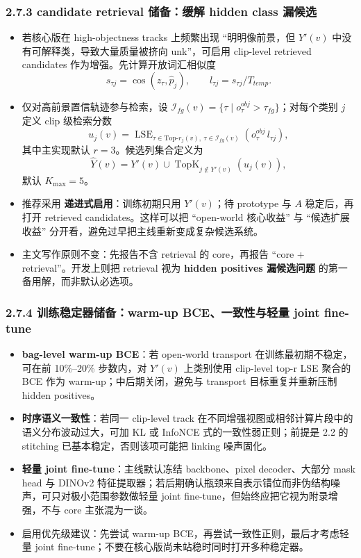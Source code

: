 \documentclass[UTF8]{ctexart}
\begin{document}
\subsubsection*{2.7.3 candidate retrieval 储备：缓解 hidden class 漏候选}
\begin{itemize}
\item 若核心版在 high-objectness tracks 上频繁出现 ``明明像前景，但 $Y'(v)$ 中没有可解释类，导致大量质量被挤向 unk''，可启用 clip-level retrieved candidates 作为增强。先计算开放词汇相似度
\[
 s_{\tau j}=\cos(z_\tau,\hat p_j),\qquad l_{\tau j}=s_{\tau j}/T_{temp}.
\]
\item 仅对高前景置信轨迹参与检索，设 $\mathcal I_{fg}(v)=\{\tau\mid o_\tau^{obj}>\tau_{fg}\}$；对每个类别 $j$ 定义 clip 级检索分数
\[
 u_j(v)=\operatorname{LSE}_{\tau\in \mathrm{Top}\text{-}r_j(v),\ \tau\in\mathcal I_{fg}(v)}(o_\tau^{obj}\, l_{\tau j}),
\]
其中主实现默认 \textbf{$r=3$}。候选列集合定义为
\[
 \hat Y(v)=Y'(v)\cup \operatorname{TopK}_{j\notin Y'(v)}(u_j(v)),
\]
默认 \textbf{$K_{\max}=5$}。
\item 推荐采用 \textbf{递进式启用}：训练初期只用 $Y'(v)$；待 prototype 与 $A$ 稳定后，再打开 retrieved candidates。这样可以把 ``open-world 核心收益'' 与 ``候选扩展收益'' 分开看，避免过早把主线重新变成复杂候选系统。
\item 主文写作原则不变：先报告不含 retrieval 的 core，再报告 ``core + retrieval''。开发上则把 retrieval 视为 \textbf{hidden positives 漏候选问题} 的第一备用解，而非默认必选项。
\end{itemize}

\subsubsection*{2.7.4 训练稳定器储备：warm-up BCE、一致性与轻量 joint fine-tune}
\begin{itemize}
\item \textbf{bag-level warm-up BCE}：若 open-world transport 在训练最初期不稳定，可在前 10\%--20\% 步数内，对 $Y'(v)$ 上类别使用 clip-level top-r LSE 聚合的 BCE 作为 warm-up；中后期关闭，避免与 transport 目标重复并重新压制 hidden positives。
\item \textbf{时序语义一致性}：若同一 clip-level track 在不同增强视图或相邻计算片段中的语义分布波动过大，可加 KL 或 InfoNCE 式的一致性弱正则；前提是 2.2 的 stitching 已基本稳定，否则该项可能把 linking 噪声固化。
\item \textbf{轻量 joint fine-tune}：主线默认冻结 backbone、pixel decoder、大部分 mask head 与 DINOv2 特征提取器；若后期确认瓶颈来自表示错位而非伪结构噪声，可只对极小范围参数做轻量 joint fine-tune，但始终应把它视为附录增强，不与 core 主张混为一谈。
\item 启用优先级建议：先尝试 warm-up BCE，再尝试一致性正则，最后才考虑轻量 joint fine-tune；不要在核心版尚未站稳时同时打开多种稳定器。
\end{itemize}
\end{document}
